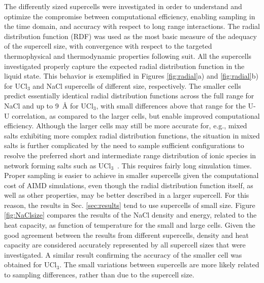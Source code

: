\documentclass[preprint,3p,10pt,onecolumn,number,sort&compress]{elsarticle}
\begin{document}
The differently sized supercells were investigated in order to understand and optimize the compromise between computational efficiency, enabling sampling in the time domain, and accuracy with respect to long range interactions. The radial distribution function (RDF) was used as the most basic measure of the adequacy of the supercell size, with convergence with respect to the targeted thermophysical and thermodynamic properties following suit. All the supercells investigated properly capture the expected radial distribution function in the liquid state. This behavior is exemplified in Figures \ref{fig:radial}a) and \ref{fig:radial}b) for UCl$_3$ and NaCl supercells of different size, respectively. The smaller cells predict essentially identical radial distribution functions across the full range for NaCl and up to 9~\AA{} for UCl$_3$, with small differences above that range for the U-U correlation, as compared to the larger cells, but enable improved computational efficiency. Although the larger cells may still be more accurate for, e.g., mixed salts exhibiting more complex radial distribution functions, the situation in mixed salts is further complicated by the need to sample sufficient configurations to resolve the preferred short and intermediate range distribution of ionic species in network forming salts such as UCl$_3$~\cite{Li}. This requires fairly long simulation times. Proper sampling is easier to achieve in smaller supercells given the computational cost of AIMD simulations, even though the radial distribution function itself, as well as other properties, may be better described in a larger supercell. For this reason, the results in Sec. \ref{sec:results} tend to use supercells of small size. Figure \ref{fig:NaClsize} compares the results of the NaCl density and energy, related to the heat capacity, as function of temperature for the small and large cells. Given the good agreement between the results from different supercells, density and heat capacity are considered accurately represented by all supercell sizes that were investigated. A similar result confirming the accuracy of the smaller cell was obtained for UCl$_3$.
The small variations between supercells are more likely related to sampling differences, rather than due to the supercell size. %
\end{document}
